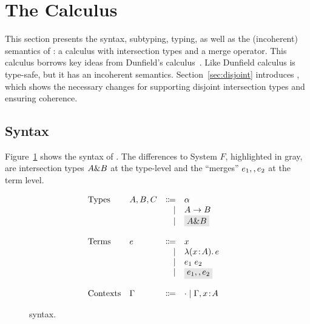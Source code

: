 \section{The \name Calculus}
\label{sec:fi}

This section presents the syntax, subtyping, typing, as well as the
(incoherent) semantics of \name: a calculus with intersection types
and a merge
operator. This calculus borrows key ideas from Dunfield's
calculus~\cite{dunfield2014elaborating}. Like Dunfield calculus
\name is type-safe, but it has an incoherent semantics.
Section~\ref{sec:disjoint} introduces \name, which shows the necessary changes
for supporting disjoint intersection types and
ensuring coherence.

\subsection{Syntax}

Figure~\ref{fig:fi-syntax} shows the syntax of \name. The differences to
System $F$, highlighted in gray, are intersection types $A \& B$ at the
type-level and the ``merges'' $e_1 ,, e_2$ at the term level.

\begin{figure}
  \[
    \begin{array}{l}
      \begin{array}{llrll}
        \text{Types}
        & A, B, C & \Coloneqq & \alpha    & \\
        &      & \mid & A \to B        & \\
        &      & \mid & \highlight{$A \inter B$}  & \\

        \\
        \text{Terms}
        & e & \Coloneqq & x            & \\
        &   & \mid & \lamty x A e      & \\
        &   & \mid & \app {e_1} {e_2}  & \\
        &   & \mid & \highlight{$e_1 \mergeop e_2$}  & \\

        \\
        \text{Contexts}
        & \Gamma & \Coloneqq & \cdot
                   \mid \Gamma, x \oftype A  & \\
      \end{array}
    \end{array}
  \]

  \caption{\name syntax.}
  \label{fig:fi-syntax}
\end{figure}

